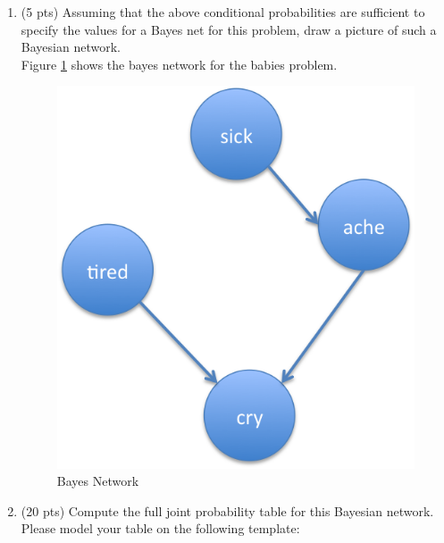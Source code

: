 \documentclass{article}%
\begin{document}
\begin{enumerate}
	\begin{enumerate}
		\item (5 pts) Assuming that the above conditional probabilities are sufficient to specify the values for a Bayes net for this problem, draw a picture of such a Bayesian network.\\
		
		Figure \ref{fig:bn} shows the bayes network for the babies problem.\\
	
\begin{figure}[!iht]
\begin{center}
  \includegraphics[scale=0.5]{bayesNetwork.png}
  \caption{Bayes Network}
  \label{fig:bn}
  \vspace*{-4ex}
\end{center}
\end{figure}

		\item (20 pts) Compute the full joint probability table for this Bayesian network. Please model your table on the following template:
	\end{enumerate}
	

\end{enumerate}
\end{document}
